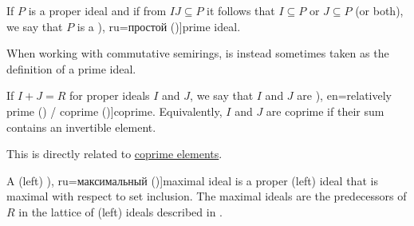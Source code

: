 \begin{definition}
\begin{thmenum}[resume=def:semiring_ideal]
     If \( P \) is a proper ideal and if from \( IJ \subseteq P \) it follows that \( I \subseteq P \) or \( J \subseteq P \) (or both), we say that \( P \) is a \term[bg=прост (\cite[7]{КоцевСидеров2016}), ru=простой (\cite[14]{ВечтомовПетров2022})]{prime ideal}.

    When working with commutative semirings,  is instead sometimes taken as the definition of a prime ideal.

     If \( I + J = R \) for proper ideals \( I \) and \( J \), we say that \( I \) and \( J \) are \term[bg=взаимно прости (\cite[18]{КоцевСидеров2016}), en=relatively prime (\cite[116]{Lang2002}) / coprime (\cite[205]{Birkhoff1948})]{coprime}. Equivalently, \( I \) and \( J \) are coprime if their sum contains an invertible element.

    This is directly related to \hyperref[def:coprime_elements]{coprime elements}.

     A (left) \term[bg=максимален (\cite[7]{КоцевСидеров2016}), ru=максимальный (\cite[13]{ВечтомовПетров2022})]{maximal ideal} is a proper (left) ideal that is maximal with respect to set inclusion. The maximal ideals are the predecessors of \( R \) in the lattice of (left) ideals described in .
  \end{thmenum}
\end{definition}


